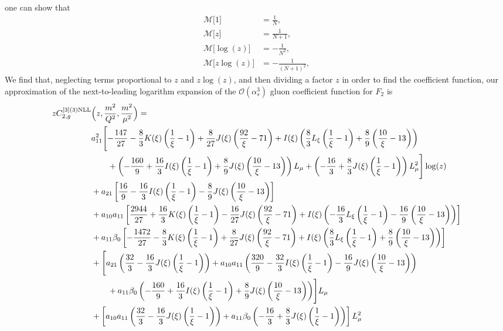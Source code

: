 \documentclass[a4paper]{article}
\newcommand{\ord}[1]{\mathcal{O} (\alpha_s^{#1})}
\begin{document}
one can show that
\begin{align}
	\mathcal{M}\bigl[1\bigr]&=\frac{1}{N}, \\
	\mathcal{M}\bigl[z\bigr]&=\frac{1}{N+1}, \\
	\mathcal{M}\bigl[\log(z)\bigr]&=-\frac{1}{N^2}, \\
	\mathcal{M}\bigl[z\log(z)\bigr]&=-\frac{1}{(N+1)^2},
\end{align}
We find that, neglecting terms proportional to $z$ and $z\log(z)$, and then dividing a factor $z$ in order to find the coefficient function, our approximation of the next-to-leading logarithm expansion of the $\ord{3}$ gluon coefficient function for $F_2$ is
\begin{equation}
	\begin{split}
		z C_{2,g}^{[3](3) \rm NLL}&\Bigl(z,\frac{m^2}{Q^2},\frac{m^2}{\mu^2}\Bigr)= \\
		& a_{11}^2\Biggl[-\frac{147}{27} - \frac{8}{3} K(\xi) \left(\frac{1}{\xi}-1\right) + \frac{8}{27} J(\xi) \left(\frac{92}{\xi} - 71\right) + I(\xi) \left(\frac{8}{3} L_\xi \left(\frac{1}{\xi}-1\right) + \frac{8}{9} \left(\frac{10}{\xi} - 13\right)\right) \\
		& \qquad + \left(-\frac{160}{9} + \frac{16}{3} I(\xi) \left(\frac{1}{\xi}-1\right) + \frac{8}{9} J(\xi) \left(\frac{10}{\xi} - 13\right)\right) L_\mu + \left(-\frac{16}{3} + \frac{8}{3} J(\xi) \left(\frac{1}{\xi}-1\right)\right) L_\mu^2\Biggr] \log(z) \\
		& + a_{21} \left[\frac{16}{9} - \frac{16}{3} I(\xi) \left(\frac{1}{\xi}-1\right) - \frac{8}{9} J(\xi) \left(\frac{10}{\xi} - 13\right)\right] \\
		& + a_{10} a_{11} \left[\frac{2944}{27} + \frac{16}{3} K(\xi) \left(\frac{1}{\xi}-1\right) - \frac{16}{27} J(\xi) \left(\frac{92}{\xi} - 71\right) + I(\xi) \left(-\frac{16}{3} L_\xi \left(\frac{1}{\xi}-1\right) - \frac{16}{9} \left(\frac{10}{\xi} - 13\right)\right)\right] \\
		& + a_{11} \beta_0 \left[-\frac{1472}{27} - \frac{8}{3} K(\xi) \left(\frac{1}{\xi}-1\right) + \frac{8}{27} J(\xi) \left(\frac{92}{\xi} - 71\right) + I(\xi) \left(\frac{8}{3} L_\xi \left(\frac{1}{\xi}-1\right) + \frac{8}{9} \left(\frac{10}{\xi} - 13\right)\right)\right] \\
		& + \Biggl[a_{21} \left(\frac{32}{3} - \frac{16}{3} J(\xi) \left(\frac{1}{\xi}-1\right) \right) + a_{10} a_{11} \left(\frac{320}{9} - \frac{32}{3} I(\xi) \left(\frac{1}{\xi}-1\right) - \frac{16}{9} J(\xi) \left(\frac{10}{\xi} - 13\right)\right) \\
		& \qquad+ a_{11} \beta_0 \left(-\frac{160}{9} + \frac{16}{3} I(\xi) \left(\frac{1}{\xi}-1\right) + \frac{8}{9} J(\xi) \left(\frac{10}{\xi} - 13\right)\right) \Biggr] L_\mu \\
		& + \left[ a_{10} a_{11} \left(\frac{32}{3} - \frac{16}{3} J(\xi) \left(\frac{1}{\xi}-1 \right)\right) + a_{11} \beta_0 \left(-\frac{16}{3} + \frac{8}{3} J(\xi) \left(\frac{1}{\xi}-1\right)\right)\right] L_\mu^2
	\end{split}
\end{equation}
\end{document}
